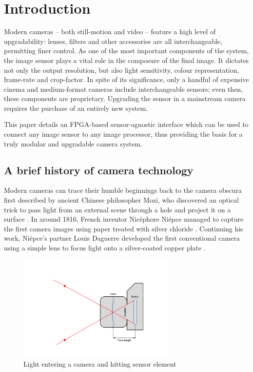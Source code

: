 \chapter{Introduction}

Modern cameras -- both still-motion and video -- feature a high level of upgradability: lenses, filters and other accessories are all interchangeable, permitting finer control. As one of the most important components of the system, the image sensor plays a vital role in the composure of the final image. It dictates not only the output resolution, but also light sensitivity, colour representation, frame-rate and crop-factor. In spite of its significance, only a handful of expensive cinema and medium-format cameras include interchangeable sensors; even then, these components are proprietary. Upgrading the sensor in a mainstream camera requires the purchase of an entirely new system.

This paper details an FPGA-based sensor-agnostic interface which can be used to connect any image sensor to any image processor, thus providing the basis for a truly modular and upgradable camera system.

\section{A brief history of camera technology}

Modern cameras can trace their humble beginnings back to the camera obscura first described by ancient Chinese philosopher Mozi, who discovered an optical trick to pass light from an external scene through a hole and project it on a surface \cite{1_woolfson_2012}. In around 1816, French inventor Nicéphore Niépce managed to capture the first camera images using paper treated with silver chloride \cite{2_stokstad_cateforis_addiss_2005}. Continuing his work, Niépce's partner Louis Daguerre developed the first conventional camera using a simple lens to focus light onto a silver-coated copper plate \cite{3_harvard_library_preservation}.

\begin{figure}
  \centering
  \includegraphics[width=0.7\textwidth]{./img/camera_physics_diagram.png}
  \caption{Light entering a camera and hitting sensor element}
  \label{fig:camera_physics_diagram}
\end{figure}

